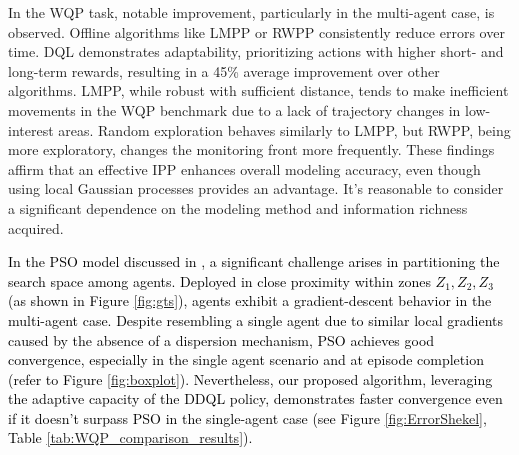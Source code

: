 \documentclass[journal]{IEEEtran}
\newcommand\changes[1]{\textcolor{black}{#1}}
\begin{document}
In the WQP task, notable improvement, particularly in the multi-agent case, is observed. Offline algorithms like LMPP or RWPP consistently reduce errors over time. DQL demonstrates adaptability, prioritizing actions with higher short- and long-term rewards, resulting in a 45\% average improvement over other algorithms. LMPP, while robust with sufficient distance, tends to make inefficient movements in the WQP benchmark due to a lack of trajectory changes in low-interest areas. Random exploration behaves similarly to LMPP, but RWPP, being more exploratory, changes the monitoring front more frequently. These findings affirm that an effective IPP enhances overall modeling accuracy, even though using local Gaussian processes provides an advantage. It's reasonable to consider a significant dependence on the modeling method and information richness acquired.


\changes{In the PSO model discussed in \cite{kathen_informative_2021}, a significant challenge arises in partitioning the search space among agents. Deployed in close proximity within zones $Z_1, Z_2, Z_3$ (as shown in Figure \ref{fig:gts}), agents exhibit a gradient-descent behavior in the multi-agent case. Despite resembling a single agent due to similar local gradients caused by the absence of a dispersion mechanism, PSO achieves good convergence, especially in the single agent scenario and at episode completion (refer to Figure \ref{fig:boxplot}). Nevertheless, our proposed algorithm, leveraging the adaptive capacity of the DDQL policy, demonstrates faster convergence even if it doesn't surpass PSO in the single-agent case (see Figure \ref{fig:ErrorShekel}, Table \ref{tab:WQP_comparison_results}).}

\end{document}
